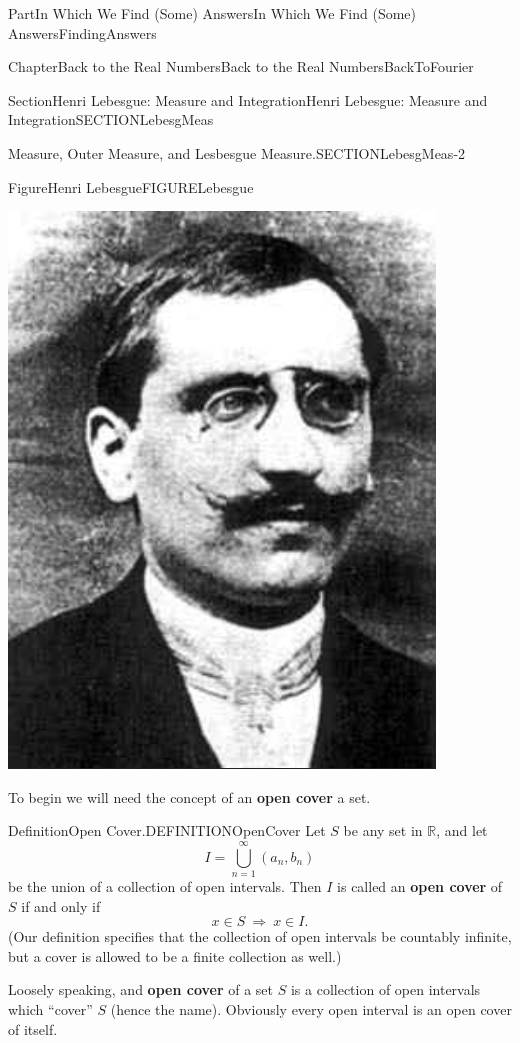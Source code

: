 \documentclass[oneside,10pt,]{book}
\newcommand{\terminology}[1]{\textbf{#1}}
\numberwithin{equation}{part}
\newcommand{\imp}{\ \Rightarrow\ }
\newcommand{\RR}{\mathbb {R}}
\begin{document}
\begin{partptx}{Part}{In Which We Find (Some) Answers}{}{In Which We Find (Some) Answers}{}{}{FindingAnswers}
\begin{chapterptx}{Chapter}{Back to the Real Numbers}{}{Back to the Real Numbers}{}{}{BackToFourier}
\begin{sectionptx}{Section}{Henri Lebesgue: Measure and Integration}{}{Henri Lebesgue: Measure and Integration}{}{}{SECTIONLebesgMeas}
\begin{paragraphs}{Measure, Outer Measure, and  Lesbesgue Measure.}{SECTIONLebesgMeas-2}
\begin{figureptx}{Figure}{Henri Lebesgue}{FIGURELebesgue}{}
\begin{image}{0.325}{0.35}{0.325}{}
\includegraphics[width=\linewidth]{external/images/Lebesgue.png}
\end{image}%
\tcblower
\end{figureptx}%
To begin we will need the concept of an \terminology{open cover} a set.%
\begin{definition}{Definition}{Open Cover.}{DEFINITIONOpenCover}%
Let \(S\) be any set in \(\RR\), and let%
\begin{equation*}
I=\bigcup_{n=1}^\infty{}(a_n,b_n)
\end{equation*}
be the union of a collection of open intervals. Then \(I\) is called an \terminology{open cover} of \(S\) if and only if%
\begin{equation*}
x\in S \imp x\in I\text{.}
\end{equation*}
(Our definition specifies that the collection of open intervals be countably infinite, but a cover is allowed to be a finite collection as well.)%
\end{definition}
Loosely speaking, and \terminology{open cover} of a set \(S\) is a collection of open intervals which ``cover'' \(S\) (hence the name). Obviously every open interval is an open cover of itself.%

\end{paragraphs}
\end{sectionptx}
\end{chapterptx}
\end{partptx}
\end{document}
